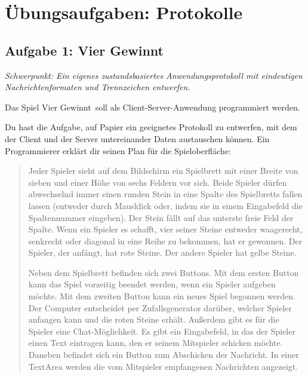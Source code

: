 \clearpage

\rehead[]{\textcolor{lightblue}{AvHG, Inf, My}}
\lohead[]{\textcolor{lightblue}{AvHG, Inf, My}}

\section{Übungsaufgaben: Protokolle}

\subsection{Aufgabe 1: Vier Gewinnt \tagLK \tagGKWahl}
\noindent \emph{Schwerpunkt: Ein eigenes zustandsbasiertes Anwendungsprotokoll mit eindeutigen Nachrichtenformaten und Trennzeichen entwerfen.}

Das Spiel \glqq Vier Gewinnt\grqq\ soll als Client-Server-Anwendung programmiert
werden.

Du hast die Aufgabe, auf Papier ein geeignetes Protokoll zu entwerfen, mit dem
der Client und der Server untereinander Daten austauschen können. Ein
Programmierer erklärt dir seinen Plan für die Spieloberfläche:

\begin{quotation}
\noindent
Jeder Spieler sieht auf dem Bildschirm ein Spielbrett mit einer Breite von
sieben und einer Höhe von sechs Feldern vor sich. Beide Spieler dürfen
abwechselnd immer einen runden Stein in eine Spalte des Spielbretts fallen
lassen (entweder durch Mausklick oder, indem sie in einem Eingabefeld die
Spaltennummer eingeben). Der Stein fällt auf das unterste freie Feld der
Spalte. Wenn ein Spieler es schafft, vier seiner Steine entweder waagerecht,
senkrecht oder diagonal in eine Reihe zu bekommen, hat er gewonnen. Der
Spieler, der anfängt, hat rote Steine. Der andere Spieler hat gelbe Steine.

\noindent
Neben dem Spielbrett befinden sich zwei Buttons. Mit dem ersten Button kann das
Spiel vorzeitig beendet werden, wenn ein Spieler aufgeben möchte. Mit dem
zweiten Button kann ein neues Spiel begonnen werden. Der Computer entscheidet
per Zufallsgenerator darüber, welcher Spieler anfangen kann und die roten
Steine erhält. Außerdem gibt es für die Spieler eine Chat-Möglichkeit. Es gibt
ein Eingabefeld, in das der Spieler einen Text eintragen kann, den er seinem
Mitspieler schicken möchte. Daneben befindet sich ein Button zum Abschicken der
Nachricht. In einer TextArea werden die vom Mitspieler empfangenen
Nachrichten angezeigt.
\end{quotation}

